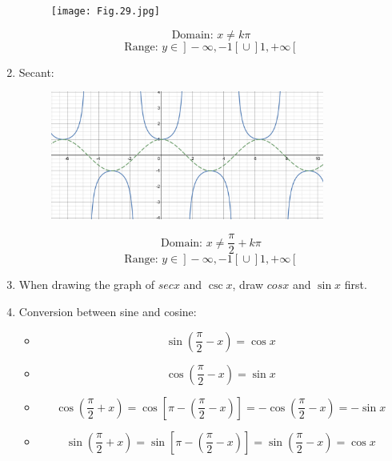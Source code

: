 \documentclass[12pt, a4paper]{article}
\begin{document}
\begin{enumerate}
  \begin{figure}[H]
    \centering
    \texttt{[image: Fig.29.jpg]}
  \end{figure}
  $$\text{Domain: }x\neq k\pi$$
  $$\text{Range: }y\in\left.\right]-\infty,-1\left[\right.\cup\left.\right]1,+\infty\left[\right.$$
  \item Secant: 
  \begin{figure}[H]
    \centering
    \includegraphics[width=0.85\textwidth]{Fig.30.jpg}
  \end{figure}
  $$\text{Domain: }x\neq\frac{\pi}{2}+k\pi$$
  $$\text{Range: }y\in\left.\right]-\infty,-1\left[\right.\cup\left.\right]1,+\infty\left[\right.$$
  \item When drawing the graph of $sec{x}$ and $\csc{x}$, draw $cos{x}$ and $\sin{x}$ first. 
  \item Conversion between sine and cosine: 
  \begin{itemize}
    \item $$\sin{\left(\frac{\pi}{2}-x\right)}=\cos{x}$$
    \item $$\cos{\left(\frac{\pi}{2}-x\right)}=\sin{x}$$
    \item $$\cos{\left(\frac{\pi}{2}+x\right)}=\cos\left[\pi-\left(\frac{\pi}{2}-x\right)\right]=-\cos{\left(\frac{\pi}{2}-x\right)}=-\sin{x}$$
    \item $$\sin{\left(\frac{\pi}{2}+x\right)}=\sin\left[\pi-\left(\frac{\pi}{2}-x\right)\right]=\sin{\left(\frac{\pi}{2}-x\right)}=\cos{x}$$
  \end{itemize}
\end{enumerate}
\end{document}
